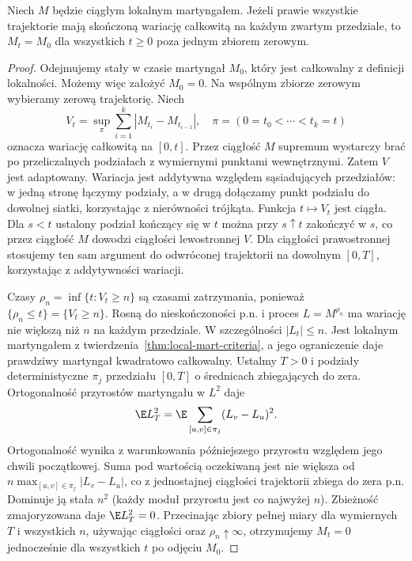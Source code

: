 \begin{twierdzenie}
\label{thm:continuous-local-finite-variation}
Niech $M$ będzie ciągłym lokalnym martyngałem.
Jeżeli prawie wszystkie trajektorie mają
skończoną wariację całkowitą na każdym
zwartym przedziale, to $M_t=M_0$ dla wszystkich
$t\ge0$ poza jednym zbiorem zerowym.
\end{twierdzenie}
\begin{proof}
Odejmujemy stały w czasie martyngał $M_0$,
który jest całkowalny z definicji lokalności.
Możemy więc założyć $M_0=0$. Na wspólnym
zbiorze zerowym wybieramy zerową trajektorię.
Niech
\[
V_t=\sup_{\pi}\sum_{i=1}^{k}
|M_{t_i}-M_{t_{i-1}}|,
\quad \pi=(0=t_0<\cdots<t_k=t)
\]
oznacza wariację całkowitą na $[0,t]$.
Przez ciągłość $M$ supremum wystarczy brać
po przeliczalnych podziałach z wymiernymi
punktami wewnętrznymi. Zatem $V$ jest
adaptowany. Wariacja jest addytywna względem
sąsiadujących przedziałów: w jedną stronę
łączymy podziały, a w drugą dołączamy punkt
podziału do dowolnej siatki, korzystając
z nierówności trójkąta.
Funkcja $t\mapsto V_t$ jest ciągła.
Dla $s<t$ ustalony podział kończący się w $t$
można przy $s\uparrow t$ zakończyć w $s$,
co przez ciągłość $M$ dowodzi ciągłości
lewostronnej $V$. Dla ciągłości prawostronnej
stosujemy ten sam argument do odwróconej
trajektorii na dowolnym $[0,T]$, korzystając
z addytywności wariacji.

Czasy $\rho_n=\inf\{t:V_t\ge n\}$ są czasami
zatrzymania, ponieważ $\{\rho_n\le t\}=\{V_t\ge n\}$.
Rosną do nieskończoności p.n. i proces
$L=M^{\rho_n}$ ma wariację nie większą niż $n$
na każdym przedziale. W szczególności
$|L_t|\le n$. Jest lokalnym martyngałem
z twierdzenia~\ref{thm:local-mart-criteria},
a jego ograniczenie daje prawdziwy
martyngał kwadratowo całkowalny.
Ustalmy $T>0$ i podziały deterministyczne
$\pi_j$ przedziału $[0,T]$ o średnicach
zbiegających do zera. Ortogonalność przyrostów
martyngału w $L^2$ daje
\[
\E L_T^2=\E\sum_{[u,v]\in\pi_j}(L_v-L_u)^2.
\]
Ortogonalność wynika z warunkowania
późniejszego przyrostu względem jego chwili
początkowej. Suma pod wartością oczekiwaną
jest nie większa od
$n\max_{[u,v]\in\pi_j}|L_v-L_u|$,
co z jednostajnej ciągłości trajektorii
zbiega do zera p.n. Dominuje ją stała $n^2$
(każdy moduł przyrostu jest co najwyżej $n$).
Zbieżność zmajoryzowana daje $\E L_T^2=0$.
Przecinając zbiory pełnej miary dla
wymiernych $T$ i wszystkich $n$, używając
ciągłości oraz $\rho_n\uparrow\infty$,
otrzymujemy $M_t=0$ jednocześnie dla
wszystkich $t$ po odjęciu $M_0$.
\end{proof}

